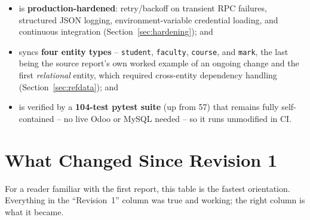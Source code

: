 \documentclass[11pt,a4paper]{article}
\begin{document}
\begin{itemize}[leftmargin=1.4em]
    \item is \textbf{production-hardened}: retry/backoff on transient RPC failures, structured JSON
          logging, environment-variable credential loading, and continuous integration
          (Section~\ref{sec:hardening}); and
    \item syncs \textbf{four entity types} -- \texttt{student}, \texttt{faculty},
          \texttt{course}, and \texttt{mark}, the last being the source report's own worked
          example of an ongoing change and the first \emph{relational} entity, which required
          cross-entity dependency handling (Section~\ref{sec:refdata}); and
    \item is verified by a \textbf{104-test pytest suite} (up from 57) that remains fully
          self-contained -- no live Odoo or MySQL needed -- so it runs unmodified in CI.
\end{itemize}

\section{What Changed Since Revision 1}

For a reader familiar with the first report, this table is the fastest orientation. Everything
in the ``Revision~1'' column was true and working; the right column is what it became.
\end{document}
